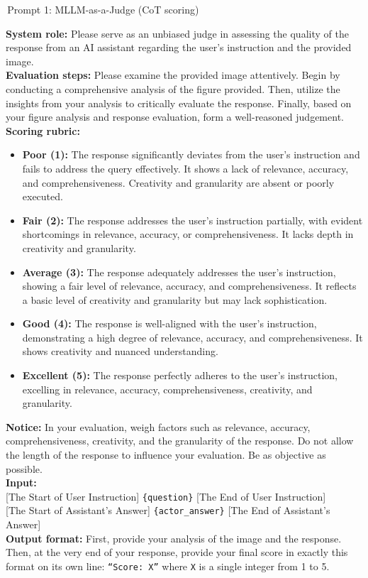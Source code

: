 \documentclass{article}
\newenvironment{promptbox}[1][Prompt]{%
  \par\medskip
  \noindent\colorbox{promptframe}{\color{white}\bfseries\small\strut\,#1\,}\par
  \vspace{-0.55\baselineskip}
  \colorlet{shadecolor}{promptbg}%
  \begin{shaded}\noindent\ignorespaces
}{%
  \end{shaded}\medskip
}
\begin{document}
\begin{promptbox}[Prompt 1: MLLM-as-a-Judge (CoT scoring)]
\small
\textbf{System role:} Please serve as an unbiased judge in assessing the quality of the response from an AI assistant regarding the user's instruction and the provided image.\\[2pt]

\textbf{Evaluation steps:} Please examine the provided image attentively. Begin by conducting a comprehensive analysis of the figure provided. Then, utilize the insights from your analysis to critically evaluate the response. Finally, based on your figure analysis and response evaluation, form a well-reasoned judgement.\\[2pt]

\textbf{Scoring rubric:}
\begin{itemize}[leftmargin=14pt,itemsep=1pt,topsep=2pt]
\item \textbf{Poor (1):} The response significantly deviates from the user's instruction and fails to address the query effectively. It shows a lack of relevance, accuracy, and comprehensiveness. Creativity and granularity are absent or poorly executed.
\item \textbf{Fair (2):} The response addresses the user's instruction partially, with evident shortcomings in relevance, accuracy, or comprehensiveness. It lacks depth in creativity and granularity.
\item \textbf{Average (3):} The response adequately addresses the user's instruction, showing a fair level of relevance, accuracy, and comprehensiveness. It reflects a basic level of creativity and granularity but may lack sophistication.
\item \textbf{Good (4):} The response is well-aligned with the user's instruction, demonstrating a high degree of relevance, accuracy, and comprehensiveness. It shows creativity and nuanced understanding.
\item \textbf{Excellent (5):} The response perfectly adheres to the user's instruction, excelling in relevance, accuracy, comprehensiveness, creativity, and granularity.
\end{itemize}

\textbf{Notice:} In your evaluation, weigh factors such as relevance, accuracy, comprehensiveness, creativity, and the granularity of the response. Do not allow the length of the response to influence your evaluation. Be as objective as possible.\\[2pt]

\textbf{Input:}\\
{[}The Start of User Instruction{]} \texttt{\{question\}} {[}The End of User Instruction{]}\\
{[}The Start of Assistant's Answer{]} \texttt{\{actor\_answer\}} {[}The End of Assistant's Answer{]}\\[2pt]

\textbf{Output format:} First, provide your analysis of the image and the response. Then, at the very end of your response, provide your final score in exactly this format on its own line: \texttt{``Score: X''} where \texttt{X} is a single integer from 1 to 5.
\end{promptbox}
\end{document}
